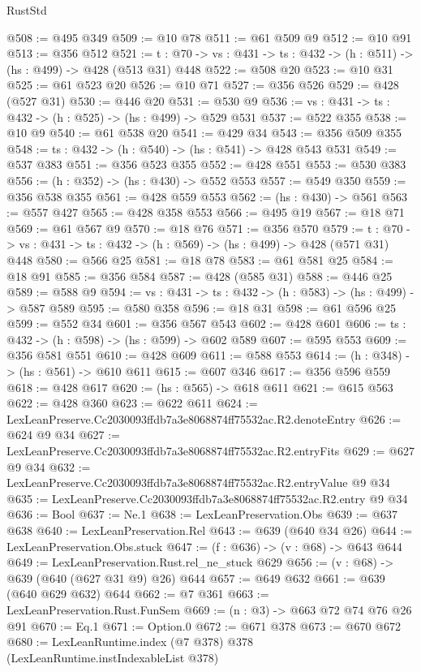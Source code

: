 \begin{lexlean}{RustStd}
\begin{coremodule}
@508 := @495 @349
@509 := @10 @78
@511 := @61 @509 @9
@512 := @10 @91
@513 := @356 @512
@521 := {t : @70} -> {vs : @431} -> {ts : @432} -> (h : @511) -> (hs : @499) -> @428 (@513 @31) @448
@522 := @508 @20
@523 := @10 @31
@525 := @61 @523 @20
@526 := @10 @71
@527 := @356 @526
@529 := @428 (@527 @31)
@530 := @446 @20
@531 := @530 @9
@536 := {vs : @431} -> {ts : @432} -> (h : @525) -> (hs : @499) -> @529 @531
@537 := @522 @355
@538 := @10 @9
@540 := @61 @538 @20
@541 := @429 @34
@543 := @356 @509 @355
@548 := {ts : @432} -> (h : @540) -> (hs : @541) -> @428 @543 @531
@549 := @537 @383
@551 := @356 @523 @355
@552 := @428 @551
@553 := @530 @383
@556 := (h : @352) -> (hs : @430) -> @552 @553
@557 := @549 @350
@559 := @356 @538 @355
@561 := @428 @559 @553
@562 := (hs : @430) -> @561
@563 := @557 @427
@565 := @428 @358 @553
@566 := @495 @19
@567 := @18 @71
@569 := @61 @567 @9
@570 := @18 @76
@571 := @356 @570
@579 := {t : @70} -> {vs : @431} -> {ts : @432} -> (h : @569) -> (hs : @499) -> @428 (@571 @31) @448
@580 := @566 @25
@581 := @18 @78
@583 := @61 @581 @25
@584 := @18 @91
@585 := @356 @584
@587 := @428 (@585 @31)
@588 := @446 @25
@589 := @588 @9
@594 := {vs : @431} -> {ts : @432} -> (h : @583) -> (hs : @499) -> @587 @589
@595 := @580 @358
@596 := @18 @31
@598 := @61 @596 @25
@599 := @552 @34
@601 := @356 @567 @543
@602 := @428 @601
@606 := {ts : @432} -> (h : @598) -> (hs : @599) -> @602 @589
@607 := @595 @553
@609 := @356 @581 @551
@610 := @428 @609
@611 := @588 @553
@614 := (h : @348) -> (hs : @561) -> @610 @611
@615 := @607 @346
@617 := @356 @596 @559
@618 := @428 @617
@620 := (hs : @565) -> @618 @611
@621 := @615 @563
@622 := @428 @360
@623 := @622 @611
@624 := LexLeanPreserve.Cc2030093ffdb7a3e8068874ff75532ac.R2.denoteEntry
@626 := @624 @9 @34
@627 := LexLeanPreserve.Cc2030093ffdb7a3e8068874ff75532ac.R2.entryFits
@629 := @627 @9 @34
@632 := LexLeanPreserve.Cc2030093ffdb7a3e8068874ff75532ac.R2.entryValue @9 @34
@635 := LexLeanPreserve.Cc2030093ffdb7a3e8068874ff75532ac.R2.entry @9 @34
@636 := Bool
@637 := Ne.{1}
@638 := LexLeanPreservation.Obs
@639 := @637 @638
@640 := LexLeanPreservation.Rel
@643 := @639 (@640 @34 @26)
@644 := LexLeanPreservation.Obs.stuck
@647 := (f : @636) -> (v : @68) -> @643 @644
@649 := LexLeanPreservation.Rust.rel_ne_stuck @629
@656 := (v : @68) -> @639 (@640 (@627 @31 @9) @26) @644
@657 := @649 @632
@661 := @639 (@640 @629 @632) @644
@662 := @7 @361
@663 := LexLeanPreservation.Rust.FunSem
@669 := (n : @3) -> @663 @72 @74 @76 @26 @91
@670 := Eq.{1}
@671 := Option.{0}
@672 := @671 @378
@673 := @670 @672
@680 := LexLeanRuntime.index (@7 @378) @378 (LexLeanRuntime.instIndexableList @378)

\end{coremodule}
\end{lexlean}
